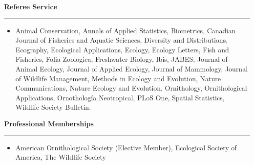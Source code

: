 \documentclass[12pt]{article}
\begin{document}








\vspace{0.5cm}

{\large \bf Referee Service} \\
\rule[3mm]{\textwidth}{0.3mm}

\begin{itemize}
  \item[] Animal Conservation, Annals of Applied Statistics,
    Biometrics, Canadian Journal of Fisheries and Aquatic Sciences,
    Diversity and Distributions, Ecography, Ecological Applications,
    Ecology, Ecology Letters, Fish and Fisheries, Folia Zoologica,
    Freshwater Biology, Ibis, JABES, Journal of Animal Ecology,
    Journal of Applied Ecology, Journal of Mammology, Journal of
    Wildlife Management, Methods in Ecology and Evolution, Nature
    Communications, Nature Ecology and Evolution, Ornithology,
    Ornithological Applications, Ornotholog\'{i}a Neotropical, PLoS
    One, Spatial Statistics, Wildlife Society Bulletin.    
\end{itemize}




\vspace{0.5cm}

{\large \bf Professional Memberships} \\
\rule[3mm]{\textwidth}{0.3mm}

\begin{itemize}
\item[] American Ornithological Society (Elective Member), Ecological
  Society of America, The Wildlife Society 
\end{itemize}
\end{document}

